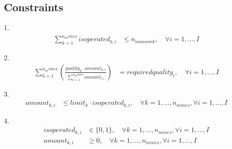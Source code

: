 \documentclass{article}
\begin{document}
\subsection*{Constraints}

1. 
\begin{align*}
\sum_{k=1}^{n_mines} isoperated_{k,i} & \leq n_{maxwork}, \quad \forall i = 1, \ldots, I
\end{align*}

2. 
\begin{align*}
\sum_{k=1}^{n_mines} \left( \frac{quality_k \cdot amount_{k,i}}{\sum_{l=1}^{n_mines} amount_{l,i}} \right) & = requiredquality_i, \quad \forall i = 1, \ldots, I
\end{align*}

3. 
\begin{align*}
amount_{k,i} & \leq limit_k \cdot isoperated_{k,i}, \quad \forall k = 1, \ldots, n_{mines}, \forall i = 1, \ldots, I
\end{align*}

4. 
\begin{align*}
isoperated_{k,i} & \in \{0, 1\}, \quad \forall k = 1, \ldots, n_{mines}, \forall i = 1, \ldots, I \\
amount_{k,i} & \geq 0, \quad \forall k = 1, \ldots, n_{mines}, \forall i = 1, \ldots, I
\end{align*}
\end{document}
